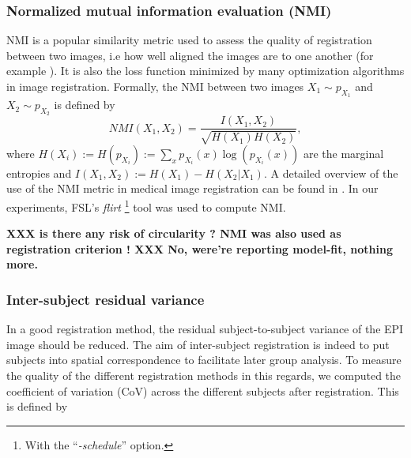 
\subsubsection{Normalized mutual information evaluation (NMI)}
NMI is a
popular similarity metric used to assess the quality of
registration between two images, i.e how well aligned the images are to one another
(for example \cite{maes1997multimodality}). It is also the loss function minimized by many
optimization algorithms in image registration.  Formally, the NMI between two images $X_1 \sim p_{X_1}$
and $X_2 \sim p_{X_2}$ is defined by
\begin{equation}
  NMI(X_1,X_2) = \frac{I(X_1,X_2)}{\sqrt{H(X_1)H(X_2)}},
\end{equation}
where $H(X_i) := H(p_{X_i}) := \sum_{x}p_{X_i}(x)\log(p_{X_i}(x))$  are the marginal entropies and
$I(X_1,X_2) := H(X_1) - H(X_2|X_1)$.
A detailed overview of
the use of the NMI metric in medical image registration can be found
in \cite{pluim2003}.
In our experiments, FSL's \textit{flirt} \footnote{With the
   ``\textit{-schedule}'' option.}
tool \cite{smith2004} was used to compute NMI. 

\textbf{XXX is there any risk of circularity ? NMI was also used as registration criterion !
XXX No, were're reporting model-fit, nothing more.}



\subsubsection{Inter-subject residual variance}
In a good registration method, the residual subject-to-subject
variance of the EPI image should be reduced. The aim of
inter-subject registration is indeed to put subjects into spatial
correspondence to facilitate later group analysis. To measure the quality of
the different registration methods in this regards, we computed the
coefficient of variation (CoV) across the different subjects after registration.
This is defined by

